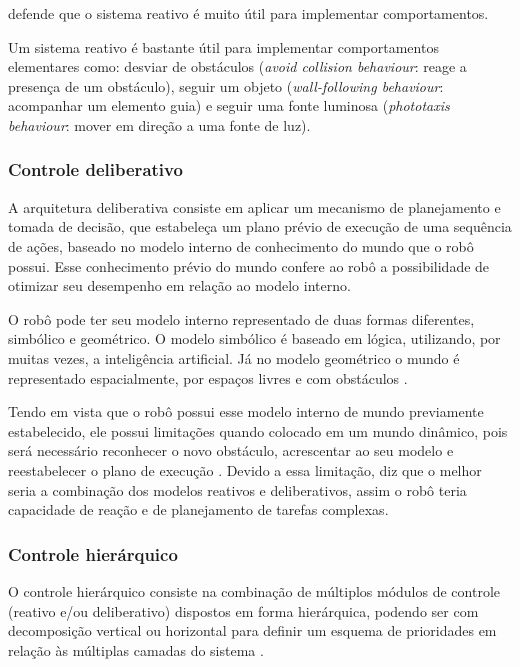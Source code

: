 	\cite{wolf2009robotica} defende que o sistema reativo é muito útil para implementar comportamentos.
\begin{citacao}
Um sistema reativo é bastante útil para implementar comportamentos elementares como: desviar de obstáculos (\textit{avoid collision behaviour}: reage a presença de um obstáculo), seguir um objeto (\textit{wall-following behaviour}: acompanhar um elemento guia) e seguir uma fonte luminosa (\textit{phototaxis behaviour}: mover em direção a uma fonte de luz). 
\end{citacao}

\subsubsection{Controle deliberativo}
A arquitetura deliberativa consiste em aplicar um mecanismo de planejamento e tomada de decisão, que estabeleça um plano prévio de execução de uma sequência de ações, baseado no modelo interno de conhecimento do mundo que o robô possui. Esse conhecimento prévio do mundo confere ao robô a possibilidade de otimizar seu desempenho em relação ao modelo interno. 

O robô pode ter seu modelo interno representado de duas formas diferentes, simbólico e geométrico. O modelo simbólico é baseado em lógica, utilizando, por muitas vezes, a inteligência artificial. Já no modelo geométrico o mundo é representado espacialmente, por espaços livres e com obstáculos \cite{industriais2009sistema}.

Tendo em vista que o robô possui esse modelo interno de mundo previamente estabelecido, ele possui limitações quando colocado em um mundo dinâmico, pois será necessário reconhecer o novo obstáculo, acrescentar ao seu modelo e reestabelecer o plano de execução \cite{industriais2009sistema}. Devido a essa limitação, \cite{wolf2009robotica} diz que o melhor seria a combinação dos modelos reativos e deliberativos, assim o robô teria capacidade de reação e de planejamento de tarefas complexas. 

\subsubsection{Controle hierárquico}
O controle hierárquico consiste na combinação de múltiplos módulos de controle (reativo e/ou deliberativo) dispostos em forma hierárquica, podendo ser com decomposição vertical ou horizontal para definir um esquema de prioridades em relação às múltiplas camadas do sistema \cite{wolf2009robotica}.

